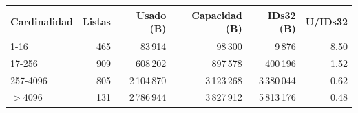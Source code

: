 \begin{tabular}{lrrrrr}
\toprule
Cardinalidad & Listas & Usado (B) & Capacidad (B) & IDs32 (B) & U/IDs32 \\
\midrule
1-16 & 465 & 83\,914 & 98\,300 & 9\,876 & 8.50 \\
17-256 & 909 & 608\,202 & 897\,578 & 400\,196 & 1.52 \\
257-4096 & 805 & 2\,104\,870 & 3\,123\,268 & 3\,380\,044 & 0.62 \\
$>$4096 & 131 & 2\,786\,944 & 3\,827\,912 & 5\,813\,176 & 0.48 \\
\bottomrule
\end{tabular}
